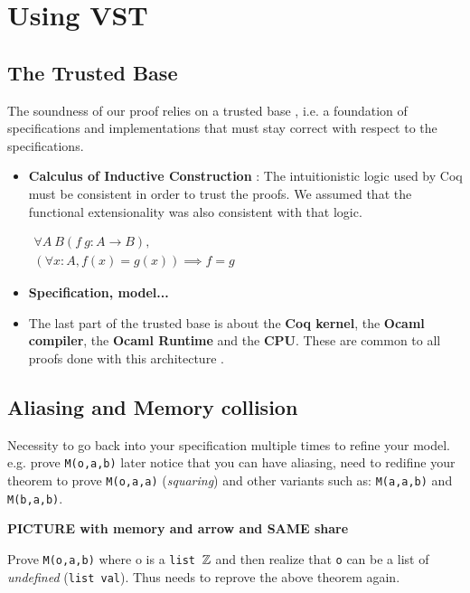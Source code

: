 \section{Using VST}

\subsection{The Trusted Base}

The soundness of our proof relies on a trusted base
, i.e. a foundation of specifications and implementations
that must stay correct with respect to the specifications.

\begin{itemize}
  \item \textbf{Calculus of Inductive Construction} : The intuitionistic logic
  used by Coq must be consistent in order to trust the proofs. We assumed that
  the functional extensionality was also consistent with that logic.

$
\begin{array}{c}
  \forall A\ B (f\ g : A \to B ),\\
  ( \forall x : A , f(x) = g(x) ) \implies f = g
\end{array}
$
  \item \textbf{Specification, model...}

  \item The last part of the trusted base is about the \textbf{Coq kernel}, the
  \textbf{Ocaml compiler}, the \textbf{Ocaml Runtime} and the \textbf{CPU}.
  These are common to all proofs done with this architecture \cite{2015-Appel,coq-faq}.
\end{itemize}

\subsection{Aliasing and Memory collision}

Necessity to go back into your specification multiple times to refine your model.
e.g. prove \texttt{M(o,a,b)} later notice that you can have aliasing, need to redifine
your theorem to prove \texttt{M(o,a,a)} (\textit{squaring}) and other variants such as:
\texttt{M(a,a,b)} and \texttt{M(b,a,b)}.

\textbf{PICTURE with memory and arrow and SAME share}

Prove \texttt{M(o,a,b)} where o is a \texttt{list $\mathbb{Z}$} and then realize that
\texttt{o} can be a list of \textit{undefined} (\texttt{list val}). Thus needs
to reprove the above theorem again.

